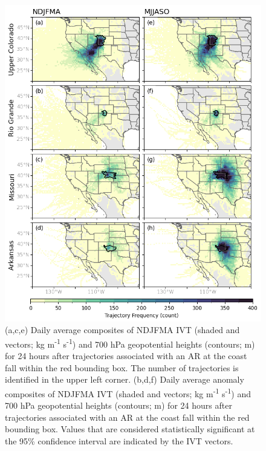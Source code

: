 \documentclass[draft,jgrga]{agutexSI2019}
\begin{document}
\begin{figure}
\noindent\includegraphics[width=\textwidth]{figS3.png}
\caption{(a,c,e) Daily average composites of NDJFMA IVT (shaded and vectors; kg m\textsuperscript{-1} s\textsuperscript{-1}) and 700 hPa geopotential heights (contours; m) for 24 hours after trajectories associated with an AR at the coast fall within the red bounding box. The number of trajectories is identified in the upper left corner. (b,d,f) Daily average anomaly composites of NDJFMA IVT (shaded and vectors; kg m\textsuperscript{-1} s\textsuperscript{-1}) and 700 hPa geopotential heights (contours; m) for 24 hours after trajectories associated with an AR at the coast fall within the red bounding box. Values that are considered statistically significant at the 95\% confidence interval are indicated by the IVT vectors.}
\label{fig:supp:composites_NDJFMA_lag1}
\end{figure}
\end{document}
